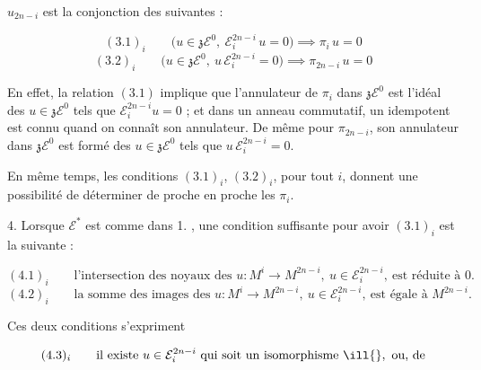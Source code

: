 
$u_{2n-i}$ est  \ill{} la conjonction des suivantes :

\[ (3.1)_{i} \qquad \bigl( u \in \mathfrak{z}\mathcal{E}^{0}, \ \mathcal{E}^{2n-i}_{i}\, u = 0 \bigr) \implies \pi_{i}\, u = 0 \]
\[ (3.2)_{i} \qquad \bigl( u \in \mathfrak{z}\mathcal{E}^{0}, \ u\, \mathcal{E}^{2n-i}_{i} = 0 \bigr) \implies \pi_{2n-i}\, u = 0 \]

En effet, la relation $(3.1)$ implique que  l'annulateur de $\pi_{i}$ dans $\mathfrak{z}\mathcal{E}^{0}$ est l'idéal
des $u \in \mathfrak{z}\mathcal{E}^{0}$ tels que $\mathcal{E}^{2n-i}_{i} u = 0$ ;
et dans un anneau commutatif, un idempotent est connu quand on connaît son
annulateur. De même pour $\pi_{2n-i}$, son annulateur dans
$\mathfrak{z}\mathcal{E}^{0}$ est formé des $u \in \mathfrak{z}\mathcal{E}^{0}$
tels que $u\, \mathcal{E}^{2n-i}_{i} = 0$.

En même temps, les conditions $(3.1)_{i}$, $(3.2)_{i}$, pour tout $i$, donnent
une  possibilité de déterminer de proche en proche les
$\pi_{i}$.

4. Lorsque $\mathcal{E}^{*}$ est comme dans 1. , une condition
suffisante pour avoir $(3.1)_{i}$ est la \struck{\ill{}} suivante :

\[ (4.1)_{i} \qquad \text{l'intersection des noyaux des } u \colon M^{i} \to M^{2n-i}, \ u \in \mathcal{E}^{2n-i}_{i}, \ \text{est réduite à } 0 . \]
\[ (4.2)_{i} \qquad \text{la somme des images des } u \colon M^{i} \to M^{2n-i}, \ u \in \mathcal{E}^{2n-i}_{i}, \ \text{est égale à } M^{2n-i} . \]

Ces deux conditions s'expriment \ill{}

\[ (4.3)_{i} \qquad \text{il existe } u \in \mathcal{E}^{2n-i}_{i} \ \text{qui soit un isomorphisme} \ \ill{}, \ \text{ou, de} \]


